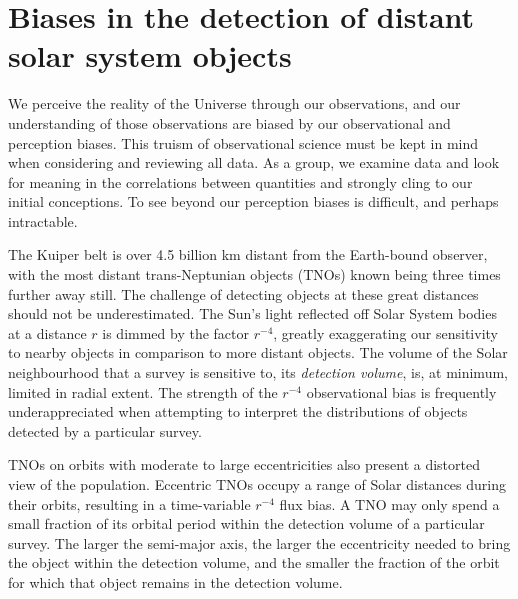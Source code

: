 \documentclass[preprint]{aastex62}
\begin{document}

\section{Biases in the detection of distant solar system objects}
\label{sec:intro}

We perceive the reality of the Universe through our observations, and our understanding of those observations are biased by our observational and perception biases. This truism of observational science must be kept in mind when considering and reviewing all data. As a group, we examine data and look for meaning in the correlations between quantities and strongly cling to our initial conceptions.  To see beyond our perception biases is difficult, and perhaps intractable. 

The Kuiper belt is over 4.5 billion km distant from the Earth-bound observer, with the most distant trans-Neptunian objects (TNOs) known being three times further away still.  The challenge of detecting objects at these great distances should not be underestimated.  The Sun's light reflected off Solar System bodies at a distance $r$ is dimmed by the factor $r^{-4}$, greatly exaggerating our sensitivity to nearby objects in comparison to more distant objects.  The volume of the Solar neighbourhood that a survey is sensitive to, its {\it detection volume},  is, at minimum, limited in radial extent. The strength of the $r^{-4}$ observational bias is frequently underappreciated when attempting to interpret the distributions of objects detected by a particular survey.

TNOs on orbits with moderate to large eccentricities also present a distorted view of the population.  Eccentric TNOs occupy a range of Solar distances during their orbits, resulting in a time-variable $r^{-4}$ flux bias. A TNO may only spend a small fraction of its orbital period within the detection volume of a particular survey. The larger the semi-major axis, the larger the eccentricity needed to bring the object within the detection volume, and the smaller the fraction of the orbit for which that object remains in the detection volume.
\end{document}
